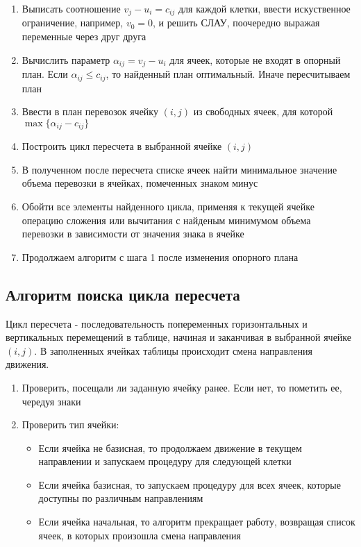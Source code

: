 \documentclass[../body.tex]{subfiles}
\begin{document}
    \begin{enumerate}
        \item Выписать соотношение $v_j-u_i=c_{ij}$ для каждой клетки, ввести искуственное ограничение, например, $v_0=0$, и решить СЛАУ, поочередно выражая переменные через друг друга
        \item Вычислить параметр $\alpha_{ij}=v_j-u_i$ для ячеек, которые не входят в опорный план. Если $\alpha_{ij} \leq c_{ij}$, то найденный план оптимальный. Иначе пересчитываем план
        \item Ввести в план перевозок ячейку $(i,j)$ из свободных ячеек, для которой $\max{\{\alpha_{ij}-c_{ij}\}}$
        \item Построить цикл пересчета в выбранной ячейке $(i,j)$
        \item В полученном после пересчета списке ячеек найти минимальное значение объема перевозки в ячейках, помеченных знаком минус
        \item Обойти все элементы найденного цикла, применяя к текущей ячейке операцию сложения или вычитания с найденым минимумом объема перевозки в зависимости от значения знака в ячейке
        \item Продолжаем алгоритм с шага 1 после изменения опорного плана
    \end{enumerate}

\subsection{Алгоритм поиска цикла пересчета}	
    Цикл пересчета - последовательность попеременных горизонтальных и вертикальных перемещений в таблице, начиная и заканчивая в выбранной ячейке $(i,j)$. В заполненных ячейках таблицы происходит смена направления движения.
    \begin{enumerate}
        \item Проверить, посещали ли заданную ячейку ранее. Если нет, то пометить ее, чередуя знаки
        \item Проверить тип ячейки:
            \begin{itemize}
                \item Если ячейка не базисная, то продолжаем движение в текущем направлении и запускаем процедуру для следующей клетки
                \item Если ячейка базисная, то запускаем процедуру для всех ячеек, которые доступны по различным направлениям
                \item Если ячейка начальная, то алгоритм прекращает работу, возвращая список ячеек, в которых произошла смена направления
            \end{itemize}
    \end{enumerate}
    
\end{document}
